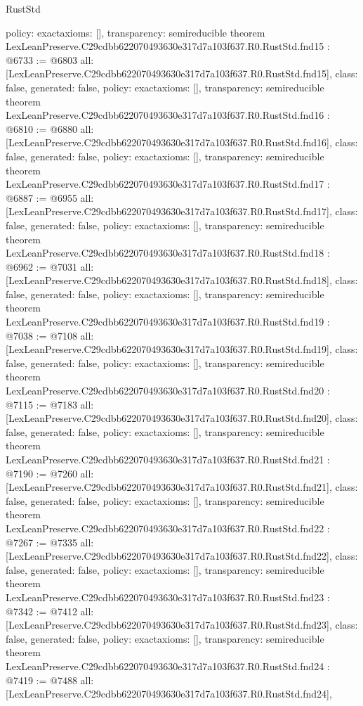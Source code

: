 \begin{lexlean}{RustStd}
\begin{coremodule}
{  policy: exact{axioms: []},
  transparency: semireducible
}
theorem LexLeanPreserve.C29cdbb622070493630e317d7a103f637.R0.RustStd.fnd15 : @6733 := @6803 {
  all: [LexLeanPreserve.C29cdbb622070493630e317d7a103f637.R0.RustStd.fnd15],
  class: false,
  generated: false,
  policy: exact{axioms: []},
  transparency: semireducible
}
theorem LexLeanPreserve.C29cdbb622070493630e317d7a103f637.R0.RustStd.fnd16 : @6810 := @6880 {
  all: [LexLeanPreserve.C29cdbb622070493630e317d7a103f637.R0.RustStd.fnd16],
  class: false,
  generated: false,
  policy: exact{axioms: []},
  transparency: semireducible
}
theorem LexLeanPreserve.C29cdbb622070493630e317d7a103f637.R0.RustStd.fnd17 : @6887 := @6955 {
  all: [LexLeanPreserve.C29cdbb622070493630e317d7a103f637.R0.RustStd.fnd17],
  class: false,
  generated: false,
  policy: exact{axioms: []},
  transparency: semireducible
}
theorem LexLeanPreserve.C29cdbb622070493630e317d7a103f637.R0.RustStd.fnd18 : @6962 := @7031 {
  all: [LexLeanPreserve.C29cdbb622070493630e317d7a103f637.R0.RustStd.fnd18],
  class: false,
  generated: false,
  policy: exact{axioms: []},
  transparency: semireducible
}
theorem LexLeanPreserve.C29cdbb622070493630e317d7a103f637.R0.RustStd.fnd19 : @7038 := @7108 {
  all: [LexLeanPreserve.C29cdbb622070493630e317d7a103f637.R0.RustStd.fnd19],
  class: false,
  generated: false,
  policy: exact{axioms: []},
  transparency: semireducible
}
theorem LexLeanPreserve.C29cdbb622070493630e317d7a103f637.R0.RustStd.fnd20 : @7115 := @7183 {
  all: [LexLeanPreserve.C29cdbb622070493630e317d7a103f637.R0.RustStd.fnd20],
  class: false,
  generated: false,
  policy: exact{axioms: []},
  transparency: semireducible
}
theorem LexLeanPreserve.C29cdbb622070493630e317d7a103f637.R0.RustStd.fnd21 : @7190 := @7260 {
  all: [LexLeanPreserve.C29cdbb622070493630e317d7a103f637.R0.RustStd.fnd21],
  class: false,
  generated: false,
  policy: exact{axioms: []},
  transparency: semireducible
}
theorem LexLeanPreserve.C29cdbb622070493630e317d7a103f637.R0.RustStd.fnd22 : @7267 := @7335 {
  all: [LexLeanPreserve.C29cdbb622070493630e317d7a103f637.R0.RustStd.fnd22],
  class: false,
  generated: false,
  policy: exact{axioms: []},
  transparency: semireducible
}
theorem LexLeanPreserve.C29cdbb622070493630e317d7a103f637.R0.RustStd.fnd23 : @7342 := @7412 {
  all: [LexLeanPreserve.C29cdbb622070493630e317d7a103f637.R0.RustStd.fnd23],
  class: false,
  generated: false,
  policy: exact{axioms: []},
  transparency: semireducible
}
theorem LexLeanPreserve.C29cdbb622070493630e317d7a103f637.R0.RustStd.fnd24 : @7419 := @7488 {
  all: [LexLeanPreserve.C29cdbb622070493630e317d7a103f637.R0.RustStd.fnd24],
}
\end{coremodule}
\end{lexlean}
